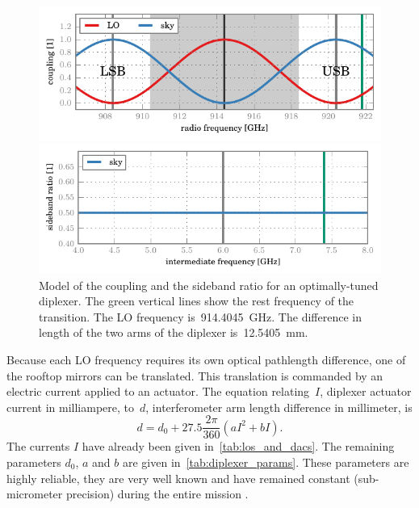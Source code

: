 \begin{figure}
    \centering
    \includegraphics{diplexer_coupling_ideal}
    \caption*{
        Coupling of the mixer to the LO and the sky for an optimally-tuned diplexer.
        The mixer--LO coupling is maximal at the LO frequency
        (black vertical line at~\SI{914.4045}{\giga\hertz}).
        The mixer--sky coupling is maximal at the center of the lower and upper sidebands (gray vertical lines LSB and USB).
    }
    \bigskip
    \includegraphics{diplexer_sbr_ideal}
    \caption*{
        Sideband ratio of the mixer--sky coupling for an optimally-tuned diplexer.
        The constant sideband ratio of \num{0.5} indicates that the LSB and the USB contribute in equal measure to each channel of the spectrum.
    }
    \caption{
        Model of the coupling and the sideband ratio for an optimally-tuned diplexer.
        The green vertical lines show the rest frequency of the  transition.
        The LO frequency is~\SI{914.4045}{\giga\hertz}.
        The difference in length of the two arms of the diplexer is~\SI{12.5405}{\milli\meter}.
    }
    \label{fig:diplexer_ideal}
\end{figure}

Because each LO frequency requires its own optical pathlength difference, 
one of the rooftop mirrors can be translated.
This translation is commanded by an electric current applied to an actuator.
The equation relating~$I$, diplexer actuator current in milliampere, to~$d$, interferometer arm length difference in millimeter, is
\begin{equation}
    d = d_0 + 27.5 \frac{2\pi}{360}(a I^2 + b I)\text{.}
\end{equation}
The currents $I$ have already been given in~\cref{tab:los_and_dacs}.
The remaining parameters $d_0$, $a$ and $b$ are given in~\cref{tab:diplexer_params}.
These parameters are highly reliable, they are very well known and have remained constant (sub-micrometer precision) during the entire mission \parencite{mueller2014flight}.

